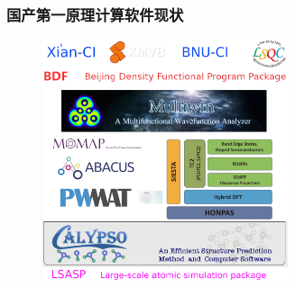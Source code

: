 \frame
{
	\frametitle{国产第一原理计算软件现状}
\begin{figure}[h!]
\vspace*{-0.19in}
\centering
\includegraphics[width=2.83in]{Figures/Softwares_China-logo.png}
\label{Software-China}
\end{figure}
	\fontsize{6.2pt}{5.2pt}\selectfont{\textcolor{red}{中国学科发展战略\,$\cdot$\,理论与计算化学,~~国家自然科学基金委员会,~中国科学院,~~北京:~科学出版社,~~2016}}
}

